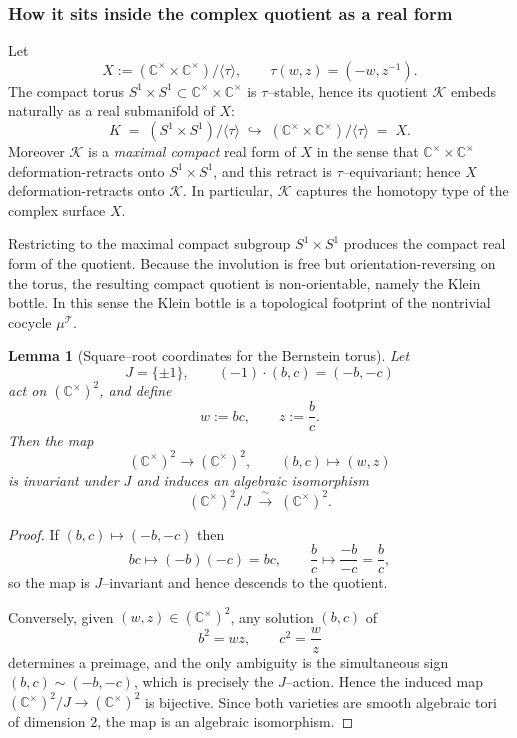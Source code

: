 \documentclass[11pt]{amsart}
\newtheorem{lemma}[theorem]{Lemma}
\theoremstyle{remark}
\theoremstyle{definition}
\newcommand{\C}{\mathbb{C}}
\def\cT{\mathcal{T}}
\def\cK{\mathcal{K}}
\begin{document}
\subsubsection{How it sits inside the complex quotient as a real form}
Let
\[
X := (\C^\times\times \C^\times)/\langle \tau\rangle,\qquad \tau(w,z)=(-w,z^{-1}).
\]
The compact torus $S^1\times S^1\subset \C^\times\times\C^\times$ is $\tau$--stable, hence its
quotient $\cK$ embeds naturally as a real submanifold of $X$:
\[
K \;=\; (S^1\times S^1)/\langle\tau\rangle \;\hookrightarrow\;
(\C^\times\times\C^\times)/\langle\tau\rangle \;=\; X.
\]
Moreover $\cK$ is a \emph{maximal compact} real form of $X$ in the sense that
$\C^\times\times\C^\times$ deformation-retracts onto $S^1\times S^1$, and this retract is
$\tau$--equivariant; hence $X$ deformation-retracts onto $\cK$.  In particular, $\cK$ captures the
homotopy type of the complex surface $X$.


Restricting to the maximal compact subgroup $S^1\times S^1$ produces the compact real form of
the quotient.  Because the involution is free but orientation-reversing on the torus,
the resulting compact quotient is non-orientable, namely the Klein bottle.  In this sense the
Klein bottle is a topological footprint of the nontrivial cocycle $\mu^\cT$.  



\begin{lemma}[Square--root coordinates for the Bernstein torus]\label{lem:bc-wz}
Let
\[
J=\{\pm 1\}, \qquad (-1)\cdot(b,c)=(-b,-c)
\]
act on $(\C^\times)^2$, and define
\[
w := bc, \qquad z := \frac{b}{c}.
\]
Then the map
\[
(\C^\times)^2 \longrightarrow (\C^\times)^2,
\qquad (b,c)\longmapsto (w,z)
\]
is invariant under $J$ and induces an algebraic isomorphism
\[
(\C^\times)^2/J \;\xrightarrow{\;\sim\;}\; (\C^\times)^2.
\]
\end{lemma}

\begin{proof}
If $(b,c)\mapsto(-b,-c)$ then
\[
bc \longmapsto (-b)(-c)=bc,\qquad 
\frac{b}{c} \longmapsto \frac{-b}{-c}=\frac{b}{c},
\]
so the map is $J$--invariant and hence descends to the quotient.

Conversely, given $(w,z)\in(\C^\times)^2$, any solution $(b,c)$ of
\[
b^2 = wz, \qquad c^2 = \frac{w}{z}
\]
determines a preimage, and the only ambiguity is the simultaneous sign
$(b,c)\sim(-b,-c)$, which is precisely the $J$--action.
Hence the induced map $(\C^\times)^2/J \to (\C^\times)^2$ is bijective.
Since both varieties are smooth algebraic tori of dimension $2$, the map
is an algebraic isomorphism.
\end{proof}
 
\end{document}
